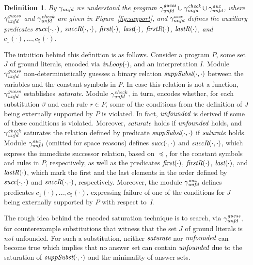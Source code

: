 \documentclass{tlp}
\newcommand{\commadots}{,\ldots,}
\newcommand{\subst}{\vartheta}
\newcommand{\wrt}{with respect to}
\newcommand{\Support}{\mathit{SUPPORT}} \newcommand{\SupportGuess}{\mathit{SUPPORT_{guess}}} \newcommand{\SupportCheck}{\mathit{SUPPORT_{check}}} \newcommand{\SupportAux}{\mathit{SUPPORT_{aux}}} \renewcommand{\Support}{\gamma_\mathit{unfd}} \renewcommand{\SupportGuess}{\Support^\mathit{guess}} \renewcommand{\SupportCheck}{\Support^\mathit{check}} \renewcommand{\SupportAux}{\Support^\mathit{aux}}
\renewcommand{\mathit}[1]{{\text{\it{#1}}}}
\newtheorem{definition}{Definition}
\begin{document}
\begin{definition}\label{def:unfounded}
By $\Support$ we understand the program $\SupportGuess \cup \SupportCheck \cup \SupportAux$, where
$\SupportGuess$ and $\SupportCheck$ are given in Figure~\ref{fig:support}, 
and $\SupportAux$ defines the auxiliary predicates $\mathit{succ}(\cdot,\cdot)$, $\mathit{succR}(\cdot,\cdot)$, $\mathit{first}(\cdot)$, $\mathit{last}(\cdot)$, $\mathit{firstR}(\cdot)$, $\mathit{lastR}(\cdot)$, and  
$c_{1}(\cdot)\commadots c_{5}(\cdot)$.
\end{definition}

The intuition behind this definition is as follows.
Consider a program $P$, some set $J$ of ground literals, encoded via $\mathit{inLoop}(\cdot)$, and an  interpretation $I$.
Module $\SupportGuess$ non-deterministically guesses a binary  relation $\mathit{suppSubst}(\cdot,\cdot)$ 
between the variables and the constant symbols in $P$. 
In case this relation is  not a function, 
$\SupportGuess$ establishes $\mathit{saturate}$. 
Module $\SupportCheck$, in turn, encodes whether, for each substitution $\subst$ and each
rule $r \in P$, some of the  conditions from the definition of $J$ being externally supported by $P$ is violated.
In fact, $\mathit{unfounded}$ is derived if some of these conditions is violated.
Moreover, $\mathit{saturate}$ holds if $\mathit{unfounded}$ holds, and $\SupportCheck$ saturates the
relation defined by predicate $\mathit{suppSubst}(\cdot,\cdot)$ if $\mathit{saturate}$ holds. 
Module $\SupportAux$ (omitted for space reasons) defines
 $\mathit{succ}(\cdot,\cdot)$ and $\mathit{succR}(\cdot,\cdot)$, which express the immediate successor relation, based on $\preceq$, for the constant symbols and rules in $P$, respectively, as well as
the predicates $\mathit{first}(\cdot)$, $\mathit{firstR}(\cdot)$, $\mathit{last}(\cdot)$, and $\mathit{lastR}(\cdot)$, which mark the first and the last elements 
in the order
defined by $\mathit{succ}(\cdot,\cdot)$ and $\mathit{succR}(\cdot,\cdot)$, respectively.
Moreover, the module $\SupportAux$ defines predicates $c_{1}(\cdot)\commadots c_{5}(\cdot)$, expressing failure of one of the conditions for $J$ being externally supported by $P$ \wrt\ $I$.

The rough idea behind the encoded saturation technique is to search, via 
$\SupportGuess$, for  counterexample substitutions that
witness that the  set $J$ of ground literals 
is \emph{not} unfounded. For such a substitution, neither  
$\mathit{saturate}$ nor $\mathit{unfounded}$ can become true which implies
that no answer set can contain $\mathit{unfounded}$ due to the saturation of $\mathit{suppSubst}(\cdot,\cdot)$ and the minimality of answer sets.
 
\end{document}
